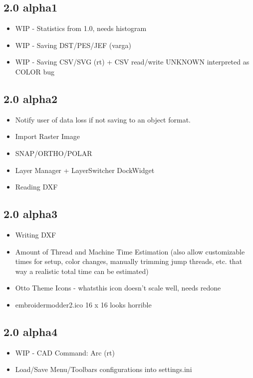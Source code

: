\documentclass[a4paper]{report}
\begin{document}
\subsection{2.0 alpha1}

\begin{itemize}
\item WIP - Statistics from 1.0, needs histogram
\item WIP - Saving DST/PES/JEF (varga)
\item WIP - Saving CSV/SVG (rt) + CSV read/write UNKNOWN interpreted as COLOR bug
\end{itemize}

\subsection{2.0 alpha2}

\begin{itemize}
\item Notify user of data loss if not saving to an object format.
\item Import Raster Image
\item SNAP/ORTHO/POLAR
\item Layer Manager + LayerSwitcher DockWidget
\item Reading DXF
\end{itemize}

\subsection{2.0 alpha3}

\begin{itemize}
\item Writing DXF
\item Amount of Thread and Machine Time Estimation (also allow customizable times for setup, color changes, manually trimming jump threads, etc. that way a realistic total time can be estimated)
\item Otto Theme Icons - whatsthis icon doesn't scale well, needs redone
\item embroidermodder2.ico 16 x 16 looks horrible
\end{itemize}

\subsection{2.0 alpha4}

\begin{itemize}
\item WIP - CAD Command: Arc (rt)
\item Load/Save Menu/Toolbars configurations into settings.ini
\end{itemize}
\end{document}
